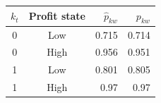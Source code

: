 \begin{tabular}{ccrr}
\toprule
$k_t$ & Profit state & $\widehat p_{kw}$ & $p_{kw}$ \\
\midrule
0 & Low & 0.715 & 0.714 \\
0 & High & 0.956 & 0.951 \\
1 & Low & 0.801 & 0.805 \\
1 & High & 0.97 & 0.97 \\
\bottomrule
\end{tabular}
